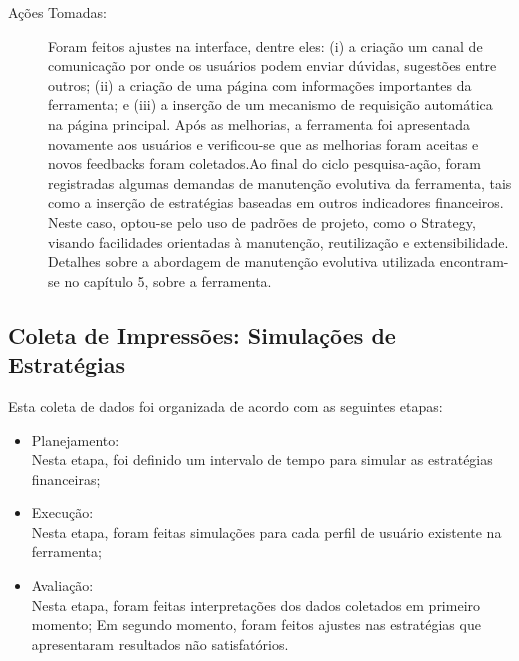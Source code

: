 \begin{description}
\item[Ações Tomadas:]

Foram feitos ajustes na interface, dentre eles: (i) a criação um canal de comunicação por onde os usuários podem enviar dúvidas, sugestões entre outros; (ii) a criação de uma página com informações importantes da ferramenta; e (iii) a inserção de um mecanismo de requisição automática na página principal. Após as melhorias, a ferramenta foi apresentada novamente aos usuários e verificou-se que as melhorias foram aceitas e novos feedbacks foram coletados.Ao final do ciclo pesquisa-ação, foram registradas algumas demandas de manutenção evolutiva da ferramenta, tais como a inserção de estratégias baseadas em outros indicadores financeiros. Neste caso, optou-se pelo uso de padrões de projeto, como o Strategy, visando facilidades orientadas à manutenção, reutilização e extensibilidade. Detalhes sobre a abordagem de manutenção evolutiva utilizada encontram-se no capítulo 5, sobre a ferramenta. 

\end{description}

\subsection{Coleta de Impressões: Simulações de Estratégias}

Esta coleta de dados foi organizada de acordo com as seguintes etapas:
\begin{itemize}
\item Planejamento:\\
Nesta etapa, foi definido um intervalo de tempo para simular as estratégias financeiras;
\item Execução:\\
Nesta etapa, foram feitas simulações para cada perfil de usuário existente na ferramenta;
\item Avaliação:\\
Nesta etapa, foram feitas interpretações dos dados coletados em primeiro momento; Em segundo momento, foram feitos ajustes nas estratégias que apresentaram resultados não satisfatórios.
\end{itemize}

